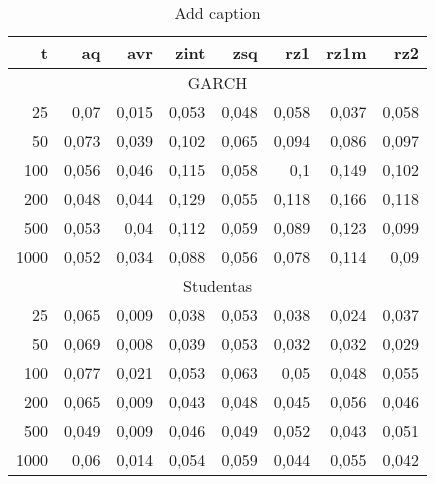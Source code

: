 \begin{table}[htbp]
  \centering
  \caption{Add caption}
    \begin{tabular}{rrrrrrrr}
    \toprule
    t     & aq    & avr   & zint  & zsq   & rz1   & rz1m  & rz2 \\
    \midrule
    \multicolumn{8}{c}{GARCH} \\
    25    & 0,07  & 0,015 & 0,053 & 0,048 & 0,058 & 0,037 & 0,058 \\
    50    & 0,073 & 0,039 & 0,102 & 0,065 & 0,094 & 0,086 & 0,097 \\
    100   & 0,056 & 0,046 & 0,115 & 0,058 & 0,1   & 0,149 & 0,102 \\
    200   & 0,048 & 0,044 & 0,129 & 0,055 & 0,118 & 0,166 & 0,118 \\
    500   & 0,053 & 0,04  & 0,112 & 0,059 & 0,089 & 0,123 & 0,099 \\
    1000  & 0,052 & 0,034 & 0,088 & 0,056 & 0,078 & 0,114 & 0,09 \\
    \multicolumn{8}{c}{Studentas} \\
    25    & 0,065 & 0,009 & 0,038 & 0,053 & 0,038 & 0,024 & 0,037 \\
    50    & 0,069 & 0,008 & 0,039 & 0,053 & 0,032 & 0,032 & 0,029 \\
    100   & 0,077 & 0,021 & 0,053 & 0,063 & 0,05  & 0,048 & 0,055 \\
    200   & 0,065 & 0,009 & 0,043 & 0,048 & 0,045 & 0,056 & 0,046 \\
    500   & 0,049 & 0,009 & 0,046 & 0,049 & 0,052 & 0,043 & 0,051 \\
    1000  & 0,06  & 0,014 & 0,054 & 0,059 & 0,044 & 0,055 & 0,042 \\
    \bottomrule
    \end{tabular}%
  \label{tab:addlabel}%
\end{table}%
